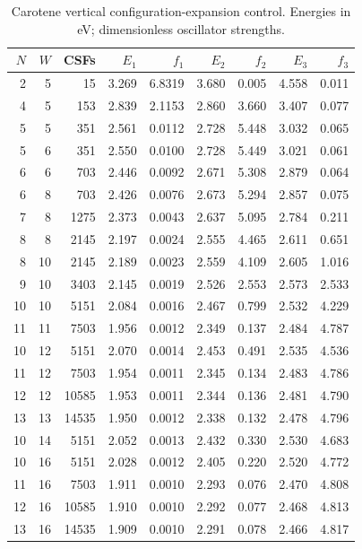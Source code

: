 \begin{table}[!htbp]\centering\small
\caption{Carotene vertical configuration-expansion control. Energies in eV; dimensionless oscillator strengths.}
\begin{tabular}{rrrrrrrrr}\toprule $N$ & $W$ & CSFs & $E_1$ & $f_1$ & $E_2$ & $f_2$ & $E_3$ & $f_3$ \\ \midrule
2 & 5 & 15 & 3.269 & 6.8319 & 3.680 & 0.005 & 4.558 & 0.011 \\
4 & 5 & 153 & 2.839 & 2.1153 & 2.860 & 3.660 & 3.407 & 0.077 \\
5 & 5 & 351 & 2.561 & 0.0112 & 2.728 & 5.448 & 3.032 & 0.065 \\
5 & 6 & 351 & 2.550 & 0.0100 & 2.728 & 5.449 & 3.021 & 0.061 \\
6 & 6 & 703 & 2.446 & 0.0092 & 2.671 & 5.308 & 2.879 & 0.064 \\
6 & 8 & 703 & 2.426 & 0.0076 & 2.673 & 5.294 & 2.857 & 0.075 \\
7 & 8 & 1275 & 2.373 & 0.0043 & 2.637 & 5.095 & 2.784 & 0.211 \\
8 & 8 & 2145 & 2.197 & 0.0024 & 2.555 & 4.465 & 2.611 & 0.651 \\
8 & 10 & 2145 & 2.189 & 0.0023 & 2.559 & 4.109 & 2.605 & 1.016 \\
9 & 10 & 3403 & 2.145 & 0.0019 & 2.526 & 2.553 & 2.573 & 2.533 \\
10 & 10 & 5151 & 2.084 & 0.0016 & 2.467 & 0.799 & 2.532 & 4.229 \\
11 & 11 & 7503 & 1.956 & 0.0012 & 2.349 & 0.137 & 2.484 & 4.787 \\
10 & 12 & 5151 & 2.070 & 0.0014 & 2.453 & 0.491 & 2.535 & 4.536 \\
11 & 12 & 7503 & 1.954 & 0.0011 & 2.345 & 0.134 & 2.483 & 4.786 \\
12 & 12 & 10585 & 1.953 & 0.0011 & 2.344 & 0.136 & 2.481 & 4.790 \\
13 & 13 & 14535 & 1.950 & 0.0012 & 2.338 & 0.132 & 2.478 & 4.796 \\
10 & 14 & 5151 & 2.052 & 0.0013 & 2.432 & 0.330 & 2.530 & 4.683 \\
10 & 16 & 5151 & 2.028 & 0.0012 & 2.405 & 0.220 & 2.520 & 4.772 \\
11 & 16 & 7503 & 1.911 & 0.0010 & 2.293 & 0.076 & 2.470 & 4.808 \\
12 & 16 & 10585 & 1.910 & 0.0010 & 2.292 & 0.077 & 2.468 & 4.813 \\
13 & 16 & 14535 & 1.909 & 0.0010 & 2.291 & 0.078 & 2.466 & 4.817 \\
\bottomrule\end{tabular}\end{table}
